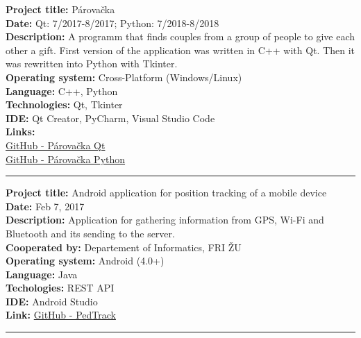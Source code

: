 \documentclass[slovak]{article}
\begin{document}
\noindent
\textbf{Project title:} Párovačka\\
\textbf{Date:} Qt: 7/2017-8/2017; Python: 7/2018-8/2018\\
\textbf{Description:} A programm that finds couples from a group of people to give each other a gift. First version of the application was written in C++ with Qt. Then it was rewritten into Python with Tkinter.\\
\textbf{Operating system:} Cross-Platform (Windows/Linux)\\
\textbf{Language:} C++, Python\\
\textbf{Technologies:} Qt, Tkinter\\
\textbf{IDE:} Qt Creator, PyCharm, Visual Studio Code\\
\textbf{Links:}\\
\href{https://github.com/kyberdrb/Parovacka\_Qt}{GitHub - Párovačka Qt}\\
\href{https://github.com/kyberdrb/Parovacka\_Python}{GitHub - Párovačka Python}

\begin{center}\rule{3in}{0.4pt}\end{center}

\noindent
\textbf{Project title:} Android application for position tracking of a mobile device\\
\textbf{Date:} Feb 7, 2017\\
\textbf{Description:} Application for gathering information from GPS, Wi-Fi and Bluetooth and its sending to the server.\\
\textbf{Cooperated by:} Departement of Informatics, FRI ŽU\\
\textbf{Operating system:} Android (4.0+)\\
\textbf{Language:} Java\\
\textbf{Techologies:} REST API\\
\textbf{IDE:} Android Studio\\
\textbf{Link:} \href{https://github.com/kyberdrb/PedTrack}{GitHub - PedTrack}

\begin{center}\rule{3in}{0.4pt}\end{center}
\end{document}
